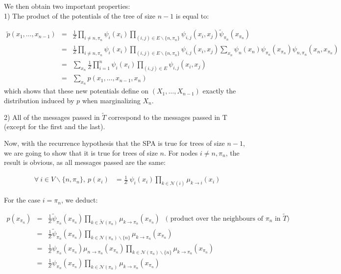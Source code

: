 \documentclass[12pt,a4paper]{report}
\newcommand{\forscribe}[2]{#2}  %
\begin{document}
We then obtain two important properties:\\

1) The product of the potentials of the tree of size $n-1$ is equal to:

\begin{eqnarray*}
\tilde{p}(x_1,\dots,x_{n-1}) & = & \frac{1}{Z}\prod_{i\neq n,\pi_n} \psi_i(x_i)\prod_{(i,j)\in E \backslash \{ n,\pi_n\}} \psi_{i,j}(x_i,x_j)\tilde{\psi}_{\pi_n}(x_{\pi_n})
\\
& = & \frac{1}{Z}\prod_{i\neq n,\pi_n} \psi_i(x_i)\prod_{(i,j)\in E \backslash \{ n,\pi_n\}} \psi_{i,j}(x_i,x_j) \sum_{x_n}\psi_n(x_n)\psi_{\pi_n}(x_{\pi_n})\psi_{n,\pi_n}(x_n,x_{\pi_n})
\\
& = & \sum_{x_n}\frac{1}{Z}\prod_{i=1}^{n} \psi_i(x_i)\prod_{(i,j)\in E } \psi_{i,j}(x_i,x_j)
\\
& = & \sum_{x_n}p(x_1,\dots,x_{n-1}, x_n)
\end{eqnarray*}
which shows that these new potentials define on $(X_1,\ldots,X_{n-1})$ exactly the distribution induced by $p$ when marginalizing $X_n$. 

2) All of the messages passed in $\tilde{T}$ correspond to the messages passed in T (except for the first and the last).

\bigskip

{\noindent} Now, with the recurrence hypothesis that the SPA is true for trees of size $n-1$, we are going to show that it is true for trees of size $n$. For nodes $i\neq n,\pi_n$, the result is obvious, as all messages passed are the same:

\begin{align}
	\forall \ i \in V\backslash\{n, \pi_n\}, \ p(x_i) &= \frac{1}{Z} \ \psi_{i} (x_i) \prod_{k \in \mathcal{N}(i)} \mu_{k \rightarrow i} (x_i)
\end{align}

For the case $i = \pi_n$, we deduct:

\begin{eqnarray*}
p(x_{\pi_n}) & = &
\frac{1}{Z}\tilde{\psi}_{\pi_n}(x_{\pi_n}) \prod_{k \in \mathcal{\tilde{N}}(\pi_n)}
\mu_{k\rightarrow\pi_n}(x_{\pi_n})\ \ \mbox{ ( \forscribe{produit sur les voisins de}{product over the neighbours of} } \pi_n \mbox{ \forscribe{dans}{in} } \tilde{T} )\\
& = &
\frac{1}{Z}\tilde{\psi}_{\pi_n}(x_{\pi_n}) \prod_{k \in \mathcal{{N}}(\pi_n) \backslash \{n \}}
\mu_{k\rightarrow\pi_n}(x_{\pi_n}) \\
& = &
\frac{1}{Z}{\psi}_{\pi_n}(x_{\pi_n}) \mu_{n\rightarrow\pi_n}(x_{\pi_n}) \prod_{k \in \mathcal{{N}}(\pi_n) \backslash \{n \}}
\mu_{k\rightarrow\pi_n}(x_{\pi_n}) \\
& = &
\frac{1}{Z}{\psi}_{\pi_n}(x_{\pi_n})  \prod_{k \in \mathcal{{N}}(\pi_n) }
\mu_{k\rightarrow\pi_n}(x_{\pi_n})
\end{eqnarray*}
\end{document}
